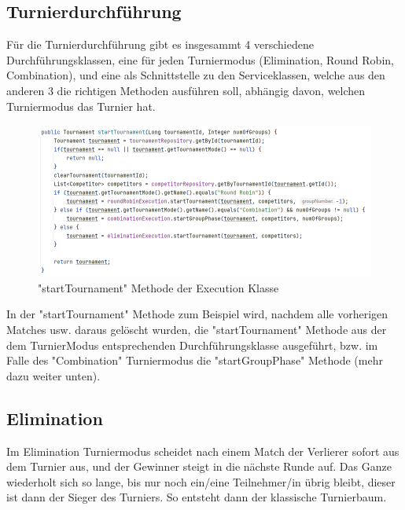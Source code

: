 \subsection{Turnierdurchführung}

Für die Turnierdurchführung gibt es insgesammt 4 verschiedene Durchführungsklassen, eine für jeden Turniermodus (Elimination, Round Robin, Combination), und eine als Schnittstelle zu den Serviceklassen, welche aus den anderen 3 
die richtigen Methoden ausführen soll, abhängig davon, welchen Turniermodus das Turnier hat. 

\begin{figure}[H]
    \includegraphics[scale=0.65]{pics/backend/execution_startTournament.png}
    \caption{"startTournament" Methode der Execution Klasse}
\end{figure}

In der "startTournament" Methode zum Beispiel wird, nachdem alle vorherigen Matches usw. daraus gelöscht wurden, die "startTournament" Methode aus der dem TurnierModus entsprechenden Durchführungsklasse ausgeführt, 
bzw. im Falle des "Combination" Turniermodus die "startGroupPhase" Methode (mehr dazu weiter unten).

\subsection{Elimination}

Im Elimination Turniermodus scheidet nach einem Match der Verlierer sofort aus dem Turnier aus, und der Gewinner steigt in die nächste Runde auf. 
Das Ganze wiederholt sich so lange, bis nur noch ein/eine Teilnehmer/in übrig bleibt, dieser ist dann der Sieger des Turniers. So entsteht dann der klassische Turnierbaum.


